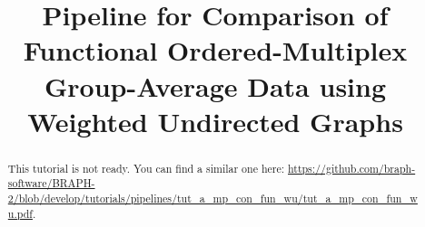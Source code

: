 \documentclass[justified]{tufte-handout}
\title[Comparison of Functional Ordered-Multiplex Group-Average Data using WU]{Pipeline for Comparison of Functional Ordered-Multiplex Group-Average Data using Weighted Undirected Graphs}
\begin{document}
\maketitle

\begin{abstract}
\noindent
This tutorial is not ready. You can find a similar one here: \url{https://github.com/braph-software/BRAPH-2/blob/develop/tutorials/pipelines/tut_a_mp_con_fun_wu/tut_a_mp_con_fun_wu.pdf}.
\end{abstract}
\end{document}

